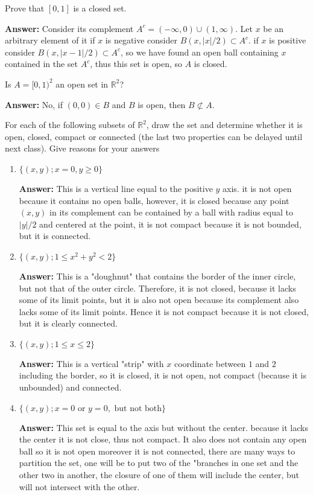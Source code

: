 \documentclass[12pt, reqno]{article} %
\newcommand{\R}{\mathbb{R}}
\newcommand{\enum}{\begin{enumerate}}
\newcommand{\fenum}{\end{enumerate}}
\begin{document}
\item Prove that $[0,1]$ is a closed set.

{\bf Answer:} Consider its complement $A^c=(-\infty, 0)\cup(1,\infty)$. Let $x$ be an arbitrary element of it if $x$ is negative consider $B(x,|x|/2)\subset A^c$. if $x$ is positive consider $B(x, |x-1|/2)\subset A^c$, so we have found an open ball containing $x$ contained in the set $A^c$, thus this set is open, so $A$ is closed.

\item Is $A=[0,1)^2$ an open set in $\R^2$?

{\bf Answer:} No, if $(0,0)\in B$ and $B$ is open, then $B\not \subset A$.
\item For each of the following subsets of $\R^2$, draw the set and determine whether it is open, closed, compact or connected (the last two properties can be delayed until next class). Give reasons for your answers
\enum
\item $\{(x,y); x=0, y\geq 0\}$

{\bf Answer:} This is a vertical line equal to the positive $y$ axis. it is not open because it contains no open balls, however, it is closed because any point $(x,y)$ in its complement can be contained by a ball with radius equal to $|y|/2$ and centered at the point, it is not compact because it is not bounded, but it is connected.

\item $\{(x,y); 1\leq x^2+y^2<2 \}$

{\bf Answer:} This is a "doughnut" that contains the border of the inner circle, but not that of the outer circle. Therefore, it is not closed, because it lacks some of its limit points, but it is also not open because its complement also lacks some of its limit points. Hence it is not compact because it is not closed, but it is clearly connected.

\item $\{(x,y); 1\leq x \leq 2 \}$

{\bf Answer:} This is a vertical "strip" with $x$ coordinate between $1$ and $2$ including the border, so it is closed, it is not open, not compact (because it is unbounded) and connected.
 
\item $\{(x,y); x=0 \mbox{ or } y= 0, \mbox{ but not both}\}$

{\bf Answer:} This set is equal to the axis but without the center. because it lacks the center it is not close, thus not compact. It also does not contain any open ball so it is not open moreover it is not connected, there are many ways to partition the set, one will be to put two of the "branches in one set and the other two in another, the closure of one of them will include the center, but will not intersect with the other.
\fenum
\end{document}
